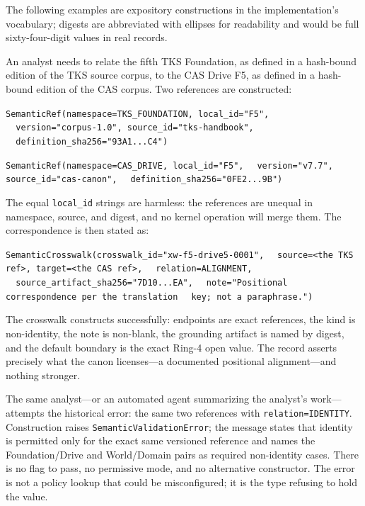 The following examples are expository constructions in the
implementation's vocabulary; digests are abbreviated with ellipses
for readability and would be full sixty-four-digit values in real
records.

\begin{example}\label{ch03:ex-legal}
An analyst needs to relate the fifth TKS Foundation, as defined in
a hash-bound edition of the TKS source corpus, to the CAS Drive
F5, as defined in a hash-bound edition of the CAS corpus. Two
references are constructed:

\texttt{SemanticRef(namespace=TKS\_FOUNDATION, local\_id="F5",}
\texttt{~~version="corpus-1.0", source\_id="tks-handbook",}
\texttt{~~definition\_sha256="93A1...C4")}

\texttt{SemanticRef(namespace=CAS\_DRIVE, local\_id="F5",}
\texttt{~~version="v7.7", source\_id="cas-canon",}
\texttt{~~definition\_sha256="0FE2...9B")}

The equal \texttt{local\_id} strings are harmless: the references
are unequal in namespace, source, and digest, and no kernel
operation will merge them. The correspondence is then stated as:

\texttt{SemanticCrosswalk(crosswalk\_id="xw-f5-drive5-0001",}
\texttt{~~source=<the TKS ref>, target=<the CAS ref>,}
\texttt{~~relation=ALIGNMENT,}
\texttt{~~source\_artifact\_sha256="7D10...EA",}
\texttt{~~note="Positional correspondence per the translation}
\texttt{~~key; not a paraphrase.")}

The crosswalk constructs successfully: endpoints are exact
references, the kind is non-identity, the note is non-blank, the
grounding artifact is named by digest, and the default boundary is
the exact Ring-4 open value. The record asserts precisely what the
canon licenses---a documented positional alignment---and nothing
stronger.
\end{example}

\begin{example}\label{ch03:ex-illegal}
The same analyst---or an automated agent summarizing the
analyst's work---attempts the historical error: the same two
references with \texttt{relation=IDENTITY}. Construction raises
\texttt{SemanticValidationError}; the message states that identity
is permitted only for the exact same versioned reference and
names the Foundation/Drive and World/Domain pairs as required
non-identity cases. There is no flag to pass, no permissive mode,
and no alternative constructor. The error is not a policy lookup
that could be misconfigured; it is the type refusing to hold the
value.
\end{example}

